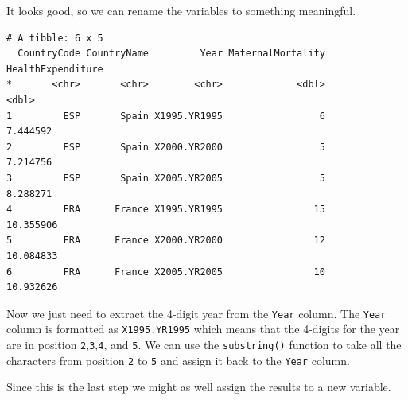 \documentclass[]{article}
\newenvironment{Shaded}{\begin{snugshade}}{\end{snugshade}}
\newcommand{\KeywordTok}[1]{\textcolor[rgb]{0.13,0.29,0.53}{\textbf{{#1}}}}
\newcommand{\DataTypeTok}[1]{\textcolor[rgb]{0.13,0.29,0.53}{{#1}}}
\newcommand{\StringTok}[1]{\textcolor[rgb]{0.31,0.60,0.02}{{#1}}}
\newcommand{\NormalTok}[1]{{#1}}
\theoremstyle{definition}
\theoremstyle{definition}
\theoremstyle{definition}
\theoremstyle{remark}
\begin{document}
It looks good, so we can rename the variables to something meaningful.

\begin{Shaded}
\end{Shaded}

\begin{verbatim}
# A tibble: 6 x 5
  CountryCode CountryName         Year MaternalMortality HealthExpenditure
*       <chr>       <chr>        <chr>             <dbl>             <dbl>
1         ESP       Spain X1995.YR1995                 6          7.444592
2         ESP       Spain X2000.YR2000                 5          7.214756
3         ESP       Spain X2005.YR2005                 5          8.288271
4         FRA      France X1995.YR1995                15         10.355906
5         FRA      France X2000.YR2000                12         10.084833
6         FRA      France X2005.YR2005                10         10.932626
\end{verbatim}

Now we just need to extract the 4-digit year from the \texttt{Year}
column. The \texttt{Year} column is formatted as \texttt{X1995.YR1995}
which means that the 4-digits for the year are in position
\texttt{2},\texttt{3},\texttt{4}, and \texttt{5}. We can use the
\texttt{substring()} function to take all the characters from position
\texttt{2} to \texttt{5} and assign it back to the \texttt{Year} column.

Since this is the last step we might as well assign the results to a new
variable.
\end{document}
